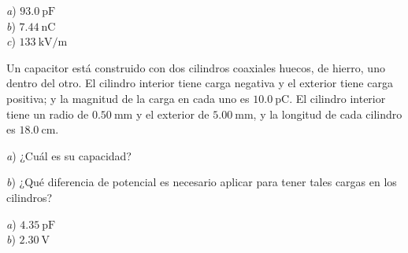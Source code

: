 \begin{Answer}
    \begin{minipage}[t]{.4\textwidth}
      \textit{a}) $\SI{93.0}{\pico\farad}$\\ \textit{b}) $\SI{7.44}{\nano\coulomb}$\\ \textit{c}) $\SI{133}{\kilo\volt/\metre}$
    \end{minipage}
\end{Answer}
%
\begin{Exercise}
  Un capacitor está construido con dos cilindros coaxiales huecos, de hierro, uno dentro del otro. El cilindro interior tiene carga negativa y el exterior tiene carga positiva; y la magnitud de la carga en cada uno es $\SI{10.0}{\pico\coulomb}$. El cilindro  interior tiene un radio de $\SI{0.50}{\milli\metre}$ y el exterior de $\SI{5.00}{\milli\metre}$, y la longitud de cada cilindro es $\SI{18.0}{\centi\metre}$.\par
  \textit{a}) ¿Cuál es su capacidad?\par
  \textit{b}) ¿Qué diferencia de potencial es necesario aplicar para tener tales cargas en los cilindros?
\end{Exercise}
\begin{Answer}
    \begin{minipage}[t]{.4\textwidth}
      \textit{a}) $\SI{4.35}{\pico\farad}$\\ \textit{b}) $\SI{2.30}{\volt}$
    \end{minipage}
\end{Answer}
%